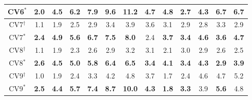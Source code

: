 \begin{table}[]
\begin{threeparttable}
\begin{tabular}{c|cccccc|cccccc}
CV6$^{*}$&\textbf{2.0} &\textbf{4.5} &\textbf{6.2} &\textbf{7.9} &\textbf{9.6} &\textbf{11.2} &\textbf{4.7} &\textbf{4.8} &2.7 &\textbf{4.3} &\textbf{6.7} &\textbf{6.7} \\
\hline
CV7$^{\dag}$&1.1 &1.9 &2.5 &2.9 &3.4 &3.9 &3.6 &3.1 &2.9 &2.8 &3.3 &2.9 \\
CV7$^{*}$&\textbf{2.4} &\textbf{4.9} &\textbf{5.6} &\textbf{6.7} &\textbf{7.5} &\textbf{8.0} &2.4 &\textbf{3.7} &\textbf{3.4} &\textbf{4.6} &\textbf{3.6} &\textbf{4.7} \\
\hline
CV8$^{\dag}$&1.1 &1.9 &2.3 &2.6 &2.9 &3.2 &3.1 &2.1 &3.0 &2.9 &2.6 &2.5 \\
CV8$^{*}$&\textbf{2.6} &\textbf{4.5} &\textbf{5.0} &\textbf{5.8} &\textbf{6.4} &\textbf{6.5} &\textbf{3.4} &\textbf{4.1} &\textbf{3.4} &\textbf{4.3} &\textbf{2.9} &\textbf{3.9} \\
\hline
CV9$^{\dag}$&1.0 &1.9 &2.4 &3.3 &4.2 &4.8 &3.7 &1.7 &2.4 &4.6 &4.7 &5.2 \\
CV9$^{*}$&\textbf{2.5} &\textbf{4.4} &\textbf{5.7} &\textbf{7.4} &\textbf{8.7} &\textbf{10.0} &\textbf{4.3} &\textbf{1.8} &\textbf{3.3} &3.9 &\textbf{5.6} &4.8 \\

\bottomrule
\end{tabular}
\end{threeparttable}
\end{table}

